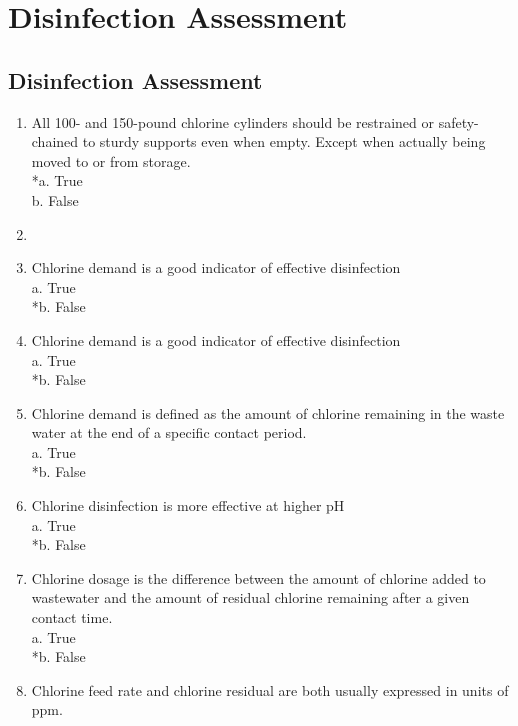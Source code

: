 
\chapter{Disinfection Assessment}

\section*{Disinfection Assessment}
\begin{enumerate}
\item All 100- and 150-pound chlorine cylinders should be restrained or safety-chained to sturdy supports even when empty. Except when actually being moved to or from storage. \\
*a. True \\
b. False \\
\item \item Chlorine demand is a good indicator of effective disinfection \\
a. True \\
*b. False \\
\item Chlorine demand is a good indicator of effective disinfection \\
a. True \\
*b. False \\
\item Chlorine demand is defined as the amount of chlorine remaining in the waste water at the end of a specific contact period. \\
a. True \\
*b. False \\
\item Chlorine disinfection is more effective at higher pH \\
a. True \\
*b. False \\
\item Chlorine dosage is the difference between the amount of chlorine added to wastewater and the amount of residual chlorine remaining after a given contact time. \\
a. True \\
*b. False \\
\item Chlorine feed rate and chlorine residual are both usually expressed in units of ppm. \\

\end{enumerate}
